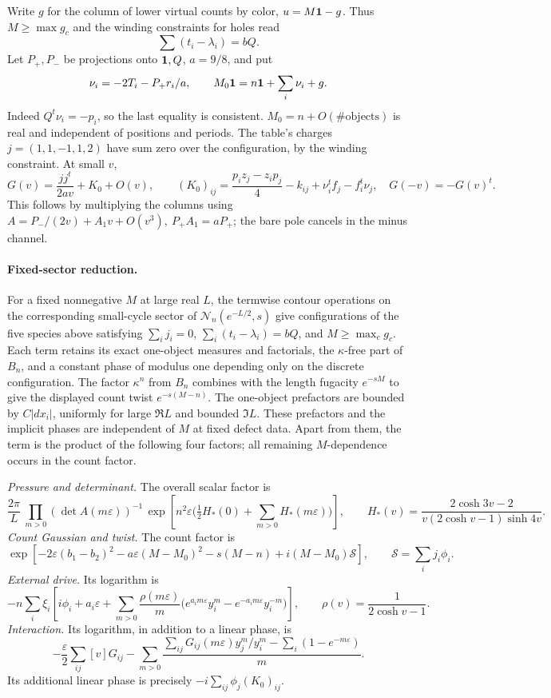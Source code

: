 Write \(g\) for the column of lower virtual counts by color, \(u=M{\bf1}-g\). Thus \(M\ge\max g_c\) and the winding constraints for holes read
\[
 \sum(t_i-\lambda_i)=bQ .
\]
Let \(P_+,P_-\) be projections onto \({\bf1},Q\), \(a=9/8\), and put
\[
 \nu_i=-2T_i-P_+ r_i/a,\qquad
 M_0{\bf1}=n{\bf1}+\sum_i\nu_i+g .
\]
Indeed \(Q^t\nu_i=-p_i\), so the last equality is consistent. \(M_0=n+O(\#\mathrm{objects})\) is real and independent of positions and periods. The table's charges \(j=(1,1,-1,1,2)\) have sum zero over the configuration, by the winding constraint. At small \(v\),
\[
 G(v)=\frac{j j^t}{2av}+K_0+O(v),\qquad
 (K_0)_{ij}=\frac{p_i z_j-z_i p_j}{4}-k_{ij}
                    +\nu_i^t f_j-f_i^t\nu_j,\quad G(-v)=-G(v)^t.
\]
This follows by multiplying the columns using \(A=P_-/(2v)+A_1 v+O(v^3),\ P_+A_1=aP_+\); the bare pole cancels in the minus channel.

\paragraph{Fixed-sector reduction.}
For a fixed nonnegative \(M\) at large real \(L\), the termwise contour operations on the corresponding small-cycle sector of \(\mathcal N_n(e^{-L/2},s)\) give configurations of the five species above satisfying \(\sum_i j_i=0\), \(\sum_i(t_i-\lambda_i)=bQ\), and \(M\ge\max_c g_c\). Each term retains its exact one-object measures and factorials, the \(\kappa\)-free part of \(B_n\), and a constant phase of modulus one depending only on the discrete configuration. The factor \(\kappa^n\) from \(B_n\) combines with the length fugacity \(e^{-sM}\) to give the displayed count twist \(e^{-s(M-n)}\). The one-object prefactors are bounded by \(C|dx_i|\), uniformly for large \(\Re L\) and bounded \(\Im L\). These prefactors and the implicit phases are independent of \(M\) at fixed defect data. Apart from them, the term is the product of the following four factors; all remaining \(M\)-dependence occurs in the count factor.

\emph{Pressure and determinant.} The overall scalar factor is
\[
 \frac{2\pi}{L}\ \prod_{m>0}(\det A(m\varepsilon))^{-1}\,
 \exp\!\left[n^2\varepsilon\Big(\tfrac12 H_*(0)+\sum_{m>0} H_*(m\varepsilon)\Big)\right],
 \qquad H_*(v)=\frac{2\cosh3v-2}{v(2\cosh v-1)\sinh4v}.
\]
\emph{Count Gaussian and twist.} The count factor is
\[
 \exp[-2\varepsilon(b_1-b_2)^2-a\varepsilon(M-M_0)^2
              -s(M-n)+i(M-M_0)\mathcal S],\qquad
 \mathcal S=\sum_i j_i\phi_i.
\]
\emph{External drive.} Its logarithm is
\[
 -n\sum_i\xi_i\left[i\phi_i+a_i\varepsilon+
     \sum_{m>0}\frac{\rho(m\varepsilon)}{m}
             \big(e^{a_i m\varepsilon}y_i^m-e^{-a_i m\varepsilon}y_i^{-m}\big)\right],
 \qquad \rho(v)=\frac1{2\cosh v-1}.
\]
\emph{Interaction.} Its logarithm, in addition to a linear phase, is
\[
 -\frac\varepsilon2\sum_{ij} [v]G_{ij}
 -\sum_{m>0}\frac{\sum_{ij}G_{ij}(m\varepsilon)y_j^m/y_i^m-\sum_i(1-e^{-m\varepsilon})}{m}.
\]
Its additional linear phase is precisely \(-i\sum_{ij}\phi_j(K_0)_{ij}\).

